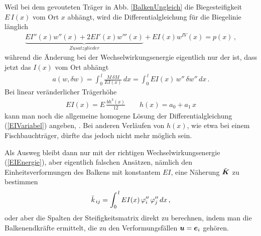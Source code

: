 Weil bei dem gevouteten Tr\"{a}ger in Abb. \ref{BalkenUngleich} die Biegesteifigkeit $E\,I(x)$ vom Ort $x$
abh\"{a}ngt, wird die Differentialgleichung f\"{u}r die Biegelinie l\"{a}nglich
\begin{align}\label{EIVariabel}
\underbrace{EI''(x) w''(x) + 2 EI'(x) w'''(x)}_{Zusatzglieder} + EI(x) w^{IV}(x) = p(x)\,,
\end{align}
w\"{a}hrend die \"{A}nderung bei der Wechselwirkungsenergie eigentlich nur der ist, dass jetzt
das $I(x)$ vom Ort abh\"{a}ngt
\begin{align}\label{EIEnergie}
a(w, \delta w) = \int_0^{\,l} \frac{M\,\delta M}{EI(x)}\,dx = \int_0^{\,l}
EI(x)\,w''\,\delta w''\,dx\,.
\end{align}
Bei linear ver\"{a}nderlicher Tr\"{a}gerh\"{o}he
\begin{align}
EI(x) = E\, \frac{b h^3(x)}{12} \qquad h(x) = a_0 + a_1\,x
\end{align}
kann man noch die allgemeine homogene L\"{o}sung der Differentialgleichung
(\ref{EIVariabel}) angeben, \cite{Ramm2}. Bei anderen Verl\"{a}ufen von $h(x)$, wie etwa bei
einem Fischbauchtr\"{a}ger, d\"{u}rfte das jedoch nicht mehr m\"{o}glich sein.

Als Ausweg bleibt dann nur mit der richtigen Wechselwirkungsenergie (\ref{EIEnergie}),
aber eigentlich falschen Ans\"{a}tzen, n\"{a}mlich den Einheitsverformungen des Balkens mit konstantem
$EI$, eine N\"{a}herung $\tilde{ \mbox{\boldmath $K$}}$ zu bestimmen
\begin{align}
\tilde k_{\,ij} = \int_0^{\,l} EI(x) \,\varphi_i''\, \varphi_j'' \,dx\,,
\end{align}
oder aber die Spalten der Steifigkeitsmatrix direkt zu berechnen, indem man die
Balkenendkr\"{a}fte ermittelt, die zu den Verformungsf\"{a}llen $\mbox{\boldmath $u$} = \mbox{\boldmath $e$}_i$ geh\"{o}ren.

